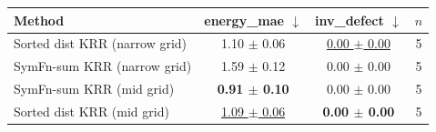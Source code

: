 \begin{tabular}{lccc}
\toprule
Method & energy\_mae $\downarrow$ & inv\_defect $\downarrow$ & $n$ \\
\midrule
Sorted dist KRR (narrow grid) & 1.10 $\pm$ 0.06 & \underline{0.00 $\pm$ 0.00} & 5 \\
SymFn-sum KRR (narrow grid) & 1.59 $\pm$ 0.12 & 0.00 $\pm$ 0.00 & 5 \\
SymFn-sum KRR (mid grid) & \textbf{0.91 $\pm$ 0.10} & 0.00 $\pm$ 0.00 & 5 \\
Sorted dist KRR (mid grid) & \underline{1.09 $\pm$ 0.06} & \textbf{0.00 $\pm$ 0.00} & 5 \\
\bottomrule
\end{tabular}
